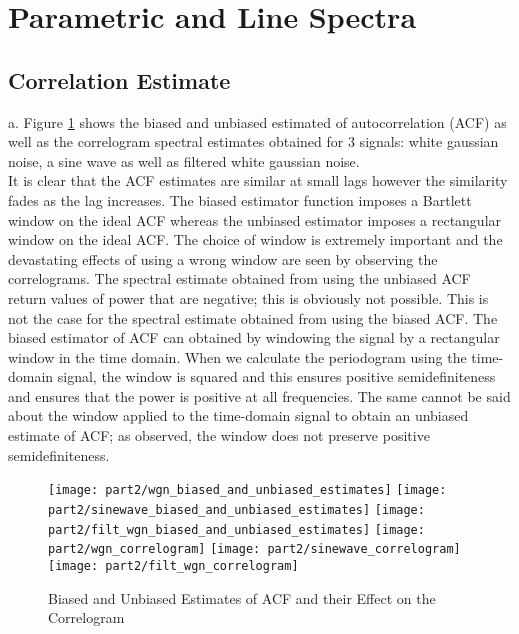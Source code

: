 \section{Parametric and Line Spectra}

\subsection{Correlation Estimate}

\noindent{}a. Figure \ref{fig:correlogram} shows the biased and unbiased estimated of autocorrelation (ACF) as well as the correlogram spectral estimates obtained for 3 signals: white gaussian noise, a sine wave as well as filtered white gaussian noise.\\

\noindent{}It is clear that the ACF estimates are similar at small lags however the similarity fades as the lag increases. The biased estimator function imposes a Bartlett window on the ideal ACF whereas the unbiased estimator imposes a rectangular window on the ideal ACF. The choice of window is extremely important and the devastating effects of using a wrong window are seen by observing the correlograms. The spectral estimate obtained from using the unbiased ACF return values of power that are negative; this is obviously not possible. This is not the case for the spectral estimate obtained from using the biased ACF. The biased estimator of ACF can obtained by windowing the signal by a rectangular window in the time domain. When we calculate the periodogram using the time-domain signal, the window is squared and this ensures positive semidefiniteness and ensures that the power is positive at all frequencies. The same cannot be said about the window applied to the time-domain signal to obtain an unbiased estimate of ACF; as observed, the window does not preserve positive semidefiniteness.

\begin{figure}[H]
\centering{}
\texttt{[image: part2/wgn\_biased\_and\_unbiased\_estimates]}
\texttt{[image: part2/sinewave\_biased\_and\_unbiased\_estimates]}
\texttt{[image: part2/filt\_wgn\_biased\_and\_unbiased\_estimates]}
\texttt{[image: part2/wgn\_correlogram]}
\texttt{[image: part2/sinewave\_correlogram]}
\texttt{[image: part2/filt\_wgn\_correlogram]}
\caption{Biased and Unbiased Estimates of ACF and their Effect on the Correlogram}
\label{fig:correlogram}
\end{figure}

